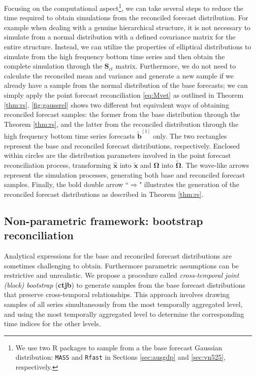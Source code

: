 \documentclass[a4paper,11pt]{article}
\newcommand{\bvet}{\bm{b}}
\newcommand{\xvet}{\bm{x}}
\newcommand{\Svet}{\bm{S}}
\newcommand{\Omegavet}{\bm{\Omega}}
\theoremstyle{definition}
\begin{document}
Focusing on the computational aspect\footnote{We use two R packages to sample from a the base forecast Gaussian distribution: \texttt{MASS} \citep{mass2002} and \texttt{Rfast} \citep{rfast2022} in Sections \ref{sec:ausgdp} and \ref{sec:vn525}, respectively.}, we can take several steps to reduce the time required to obtain simulations from the reconciled forecast distribution. For example when dealing with a genuine hierarchical structure, it is not necessary to simulate from a normal distribution with a defined covariance matrix for the entire structure. Instead, we can utilize the properties of elliptical distributions to simulate from the high frequency bottom time series and then obtain the complete simulation through the $\Svet_{ct}$ matrix. Furthermore, we do not need to calculate the reconciled mean and variance and generate a new sample if we already have a sample from the normal distribution of the base forecasts; we can simply apply the point forecast reconciliation \eqref{eq:Mvet} as outlined in Theorem \ref{thm:rs}. \autoref{fig:gaussrel} shows two different but equivalent ways of obtaining reconciled forecast samples: the former from the base distribution through the Theorem \ref{thm:rs}, and the latter from the reconciled distribution through the high frequency bottom time series forecasts $\widetilde{\bvet}^{[1]}$ only.
The two rectangles represent the base and reconciled forecast distributions, respectively. Enclosed within circles are the distribution parameters involved in the point forecast reconciliation process, transforming $\widehat{\xvet}$ into $\widetilde{\xvet}$ and $\Omegavet$ into $\widetilde{\Omegavet}$. The wave-like arrows represent the simulation processes, generating both base and reconciled forecast samples. Finally, the bold double arrow “$\Rightarrow$" illustrates the generation of the reconciled forecast distributions as described in Theorem \ref{thm:rs}.


\subsection{Non-parametric framework: bootstrap reconciliation}\label{ssec:boot}

Analytical expressions for the base and reconciled forecast distributions are sometimes challenging to obtain. Furthermore parametric assumptions can be restrictive and unrealistic. We propose a procedure called \textit{cross-temporal joint (block) bootstrap} (\textbf{ctjb}) to generate samples from the base forecast distributions that preserve cross-temporal relationships. This approach involves drawing samples of all series simultaneously from the most temporally aggregated level, and using the most temporally aggregated level to determine the corresponding time indices for the other levels.
\end{document}
